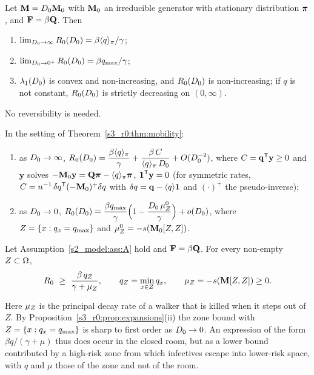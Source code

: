 \begin{theorem}\label{s3_r0:thm:mobility}
  Let $\mathbf{M}=D_0\mathbf{M}_0$ with $\mathbf{M}_0$ an irreducible generator with stationary distribution $\boldsymbol{\pi}$, and
  $\mathbf{F}=\beta\mathbf{Q}$.  Then
  \begin{enumerate}[label=\textup{(\alph*)},leftmargin=*]
    \item $\lim_{D_0\to\infty}R_0(D_0)=\beta\langle q\rangle_{\pi}/\gamma$;
    \item $\lim_{D_0\to0^+}R_0(D_0)=\beta q_{\max}/\gamma$;
    \item $\lambda_1(D_0)$ is convex and non-increasing, and $R_0(D_0)$ is non-increasing; if $q$ is not constant,
      $R_0(D_0)$ is strictly decreasing on $(0,\infty)$.
  \end{enumerate}
  No reversibility is needed.
\end{theorem}

\begin{proposition}[Expansions]\label{s3_r0:prop:expansions}
  In the setting of Theorem~\ref{s3_r0:thm:mobility}:
  \begin{enumerate}[label=\textup{(\roman*)},leftmargin=*]
    \item as $D_0\to\infty$, $R_0(D_0)=\dfrac{\beta\langle q\rangle_{\pi}}{\gamma}+\dfrac{\beta\,C}{\langle q\rangle_{\pi}\,D_0}+O(D_0^{-2})$, where
      $C=\mathbf{q}^{\mathsf{T}}\mathbf{y}\ge0$ and $\mathbf{y}$ solves $-\mathbf{M}_0\mathbf{y}=\mathbf{Q}\boldsymbol{\pi}-\langle q\rangle_{\pi}\boldsymbol{\pi}$, $\boldsymbol{1}^{\mathsf{T}}\mathbf{y}=0$
      (for symmetric rates, $C=n^{-1}\,\delta q^{\mathsf{T}}(-\mathbf{M}_0)^{+}\delta q$ with $\delta q=\mathbf{q}-\langle q\rangle\boldsymbol{1}$
      and $(\cdot)^{+}$ the pseudo-inverse);
    \item as $D_0\to0$, $R_0(D_0)=\dfrac{\beta q_{\max}}{\gamma}\Bigl(1-\dfrac{D_0\,\mu^0_Z}{\gamma}\Bigr)+o(D_0)$, where
      $Z=\{x:q_x=q_{\max}\}$ and $\mu^0_Z=-s(\mathbf{M}_0[Z,Z])$.
  \end{enumerate}
\end{proposition}

\begin{proposition}\label{s3_r0:prop:zone}
  Let Assumption~\ref{s2_model:ass:A} hold and $\mathbf{F}=\beta\mathbf{Q}$.  For every non-empty $Z\subset\Omega$,
  \begin{equation}\label{s3_r0:eq:zone}
    R_0\ \ge\ \frac{\beta\,q_Z}{\gamma+\mu_Z},\qquad q_Z=\min_{x\in Z}q_x,\qquad \mu_Z=-s(\mathbf{M}[Z,Z])\ge0 .
  \end{equation}
\end{proposition}

Here $\mu_Z$ is the principal decay rate of a walker that is killed when it steps out of $Z$. By
Proposition~\ref{s3_r0:prop:expansions}(ii) the zone bound with $Z=\{x:q_x=q_{\max}\}$ is sharp to first order as
$D_0\to0$. An expression of the form $\beta q/(\gamma+\mu)$ thus does occur in the closed room, but as a lower
bound contributed by a high-risk zone from which infectives escape into lower-risk space, with $q$ and $\mu$
those of the zone and not of the room.

